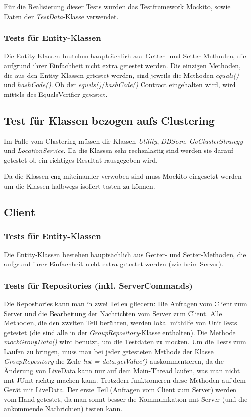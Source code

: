 \documentclass[11pt,a4paper]{scrartcl}
\begin{document}
Für die Realisierung dieser Tests wurden das Testframework Mockito, sowie Daten der \textit{TestData}-Klasse verwendet.

\subsubsection{Tests für Entity-Klassen}
Die Entity-Klassen bestehen hauptsächlich aus Getter- und Setter-Methoden, die aufgrund ihrer Einfachheit nicht extra getestet werden. Die einzigen Methoden, die aus den Entity-Klassen getestet werden, sind jeweils die Methoden \textit{equals()} und \textit{hashCode()}. Ob der \textit{equals()}/\textit{hashCode()} Contract eingehalten wird, wird mittels des EqualsVerifier getestet.

\subsection{Test für Klassen bezogen aufs Clustering}
Im Falle vom Clustering müssen die Klassen \textit{Utility}, \textit{DBScan}, \textit{GoClusterStrategy} und \textit{LocationService}. Da die Klassen sehr rechenlastig sind werden sie darauf getestet ob ein richtiges Resultat rausgegeben wird.

Da die Klassen eng miteinander verwoben sind muss Mockito eingesetzt werden um die Klassen halbwegs isoliert testen zu können.

\subsection{Client}

\subsubsection{Tests für Entity-Klassen}
Die Entity-Klassen bestehen hauptsächlich aus Getter- und Setter-Methoden, die aufgrund ihrer Einfachheit nicht extra getestet werden (wie beim Server). 

\subsubsection{Tests für Repositories (inkl. ServerCommands)}
Die Repositories kann man in zwei Teilen gliedern: Die Anfragen vom Client zum Server und die Bearbeitung der Nachrichten vom Server zum Client. Alle Methoden, die den zweiten Teil berühren, werden lokal mithilfe von UnitTests getestet (die sind alle in der \textit{GroupRepository}-Klasse enthalten). Die Methode \textit{mockGroupData()} wird benutzt, um die Testdaten zu mocken. Um die Tests zum Laufen zu bringen, muss man bei jeder getesteten Methode der Klasse \textit{GroupRepository} die Zeile \textit{list = data.getValue()} auskommentieren, da die Änderung von LiveData kann nur auf dem Main-Thread laufen, was man nicht mit JUnit richtig machen kann. Trotzdem funktionieren diese Methoden auf dem Gerät mit LiveData.
Der erste Teil (Anfragen vom Client zum Server) werden vom Hand getestet, da man somit besser die Kommunikation mit Server (und die ankommende Nachrichten) testen kann.
\end{document}
